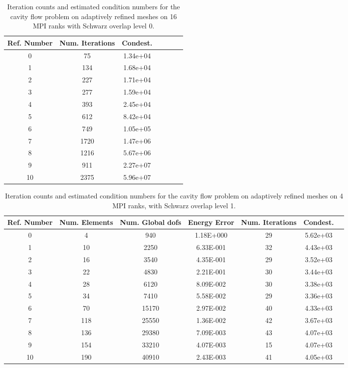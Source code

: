 \documentclass[11pt]{amsart}
\begin{document}
\begin{table}
\begin{tabular}{ c  c  c  c  c  c c}
Ref. Number	&Num. Iterations	&Condest.\\
\hline
0	&75	&1.34e+04\\
1	&134	&1.68e+04\\
2	&227	&1.71e+04\\
3	&277	&1.59e+04\\
4	&393	&2.45e+04\\
5	&612	&8.42e+04\\
6	&749	&1.05e+05\\
7	&1720	&1.47e+06\\
8	&1216	&5.67e+06\\
9	&911	&2.27e+07\\
10 	&2375	&5.96e+07\\
\end{tabular}
\caption{Iteration counts and estimated condition numbers for the cavity flow problem on adaptively refined meshes on 16 MPI ranks with Schwarz overlap level 0.}
\label{table:stokesConditioningStudyAdaptiveMeshes16Ranks}
\end{table}

\begin{table}
\begin{tabular}{ c  c  c  c  c  c c}
Ref. Number	&Num. Elements	& Num. Global dofs		&Energy Error	&Num. Iterations	&Condest.\\
\hline
0	&4	&940	&1.18E+000	&29	&5.62e+03\\
1	&10	&2250	&6.33E-001	&32	&4.43e+03\\
2	&16	&3540	&4.35E-001	&29	&3.52e+03\\
3	&22	&4830	&2.21E-001	&30	&3.44e+03\\
4	&28	&6120	&8.09E-002	&30	&3.38e+03\\
5	&34	&7410	&5.58E-002	&29	&3.36e+03\\
6	&70	&15170	&2.97E-002	&40	&4.33e+03\\
7	&118	&25550	&1.36E-002	&42	&3.67e+03\\
8	&136	&29380	&7.09E-003	&43	&4.07e+03\\
9	&154	&33210	&4.07E-003	&15	&4.07e+03\\
10	&190	&40910	&2.43E-003	&41	&4.05e+03\\
\end{tabular}
\caption{Iteration counts and estimated condition numbers for the cavity flow problem on adaptively refined meshes on 4 MPI ranks, with Schwarz overlap level 1.}
\label{table:stokesConditioningStudyAdaptiveMeshes4RanksOverlap1}
\end{table}
\end{document}
